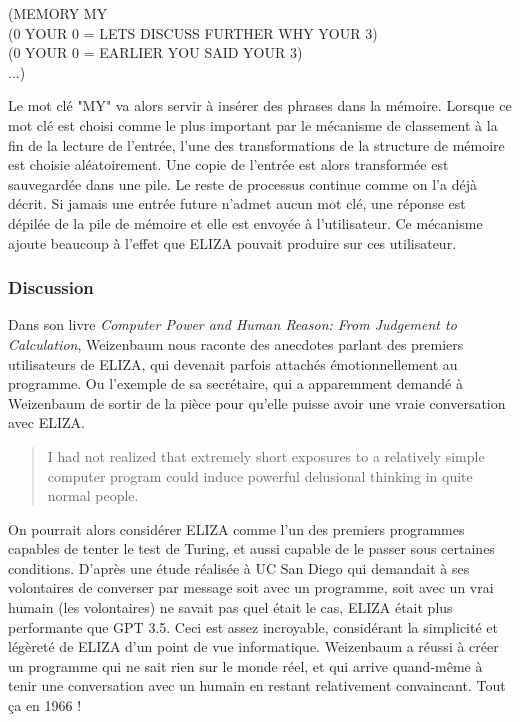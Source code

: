 \documentclass[11pt,a4paper]{report}
\begin{document}
  \begin{center}
    (MEMORY MY \\
    (0 YOUR 0 = LETS DISCUSS FURTHER WHY YOUR 3) \\
    (0 YOUR 0 = EARLIER YOU SAID YOUR 3) \\
    ...)
  \end{center}

  Le mot clé "MY" va alors servir à insérer des phrases dans la mémoire. Lorsque ce mot clé 
  est choisi comme le plus important par le mécanisme de classement à la fin de la lecture 
  de l'entrée, l'une des transformations de la structure de mémoire est choisie aléatoirement. 
  Une copie de l'entrée est alors transformée est sauvegardée dans une pile. Le reste de processus 
  continue comme on l'a déjà décrit. Si jamais une entrée future n'admet aucun mot clé, une réponse 
  est dépilée de la pile de mémoire et elle est envoyée à l'utilisateur. Ce mécanisme ajoute 
  beaucoup à l'effet que ELIZA pouvait produire sur ces utilisateur. 

  \subsubsection*{Discussion}

  Dans son livre \textit{Computer Power and Human Reason: From Judgement to Calculation}, 
  Weizenbaum nous raconte des anecdotes parlant des premiers utilisateurs de ELIZA, 
  qui devenait parfois attachés émotionnellement au programme. Ou l'exemple de sa 
  secrétaire, qui a apparemment demandé à Weizenbaum de sortir de la pièce pour qu'elle 
  puisse avoir une vraie conversation avec ELIZA.  

  \begin{quote}
    I had not realized that extremely short exposures to a relatively simple computer program could 
    induce powerful delusional thinking in quite normal people.
  \end{quote}

  On pourrait alors considérer ELIZA comme l'un des premiers programmes capables de tenter 
  le test de Turing, et aussi capable de le passer sous certaines conditions. 
  D'après une étude réalisée à UC San Diego qui demandait à ses volontaires de converser 
  par message soit avec un programme, soit avec un vrai humain (les volontaires) ne savait 
  pas quel était le cas, ELIZA était plus performante que GPT 3.5. 
  Ceci est assez incroyable, considérant la simplicité et légèreté de ELIZA d'un point de vue 
  informatique. Weizenbaum a réussi à créer un programme qui ne sait rien sur le monde réel, 
  et qui arrive quand-même à tenir une conversation avec un humain en restant relativement 
  convaincant. Tout ça en 1966 ! 
  
\end{document}
